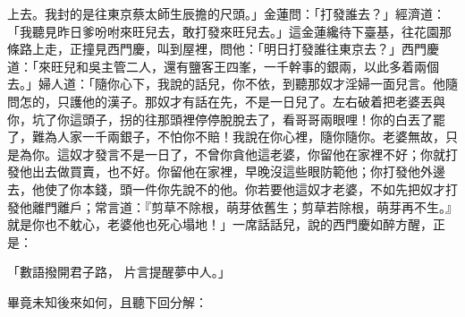 上去。我封的是往東京蔡太師生辰擔的尺頭。」金蓮問：「打發誰去？」經濟道：「我聽見昨日爹吩咐來旺兒去，敢打發來旺兒去。」這金蓮纔待下臺基，往花園那條路上走，正撞見西門慶，叫到屋裡，問他：「明日打發誰往東京去？」西門慶道：「來旺兒和吳主管二人，還有鹽客王四峯，一千幹事的銀兩，以此多着兩個去。」婦人道：「隨你心下，我說的話兒，你不依，到聽那奴才淫婦一面兒言。他隨問怎的，只護他的漢子。那奴才有話在先，不是一日兒了。左右破着把老婆丟與你，坑了你這頭子，拐的往那頭裡停停脫脫去了，看哥哥兩眼哩！你的白丟了罷了，難為人家一千兩銀子，不怕你不賠！我說在你心裡，隨你隨你。老婆無故，只是為你。這奴才發言不是一日了，不曾你貪他這老婆，你留他在家裡不好；你就打發他出去做買賣，也不好。你留他在家裡，早晚沒這些眼防範他；你打發他外邊去，他使了你本錢，頭一件你先說不的他。你若要他這奴才老婆，不如先把奴才打發他離門離戶；常言道：『剪草不除根，萌芽依舊生；剪草若除根，萌芽再不生。』就是你也不躭心，老婆他也死心塌地！」一席話話兒，說的西門慶如醉方醒，正是：

「數語撥開君子路，  片言提醒夢中人。」

畢竟未知後來如何，且聽下回分解：

